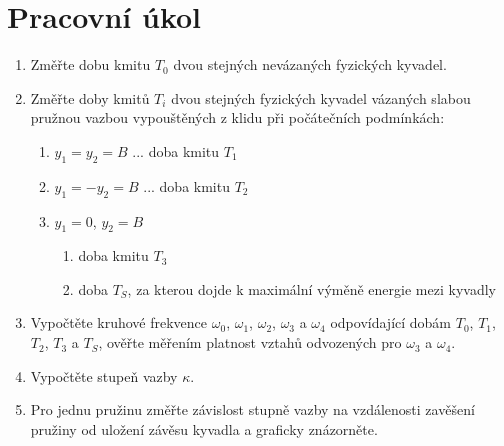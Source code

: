 \documentclass[a4paper]{article}
\author{"Václav Kubíček"}
\begin{document}
\section*{Pracovní úkol}
\begin{enumerate}%
\item Změřte dobu kmitu $T_0$ dvou stejných nevázaných fyzických kyvadel.
\item Změřte doby kmitů $T_i$ dvou stejných fyzických kyvadel vázaných slabou pružnou vazbou vypouštěných z klidu při počátečních podmínkách:
\begin{enumerate}[label=\alph*.]
    \item $y_1=y_2=B$ ... doba kmitu $T_1$
    \item $y_1=-y_2=B$ ... doba kmitu $T_2$
    \item $y_1=0$, $y_2=B$
    \begin{enumerate}[I]
        \item doba kmitu $T_3$
        \item doba ${T_S}$, za kterou dojde k maximální výměně energie mezi kyvadly
    \end{enumerate}
\end{enumerate}
\item Vypočtěte kruhové frekvence $\omega_0$, $\omega_1$, $\omega_2$, $\omega_3$ a $\omega_4$ odpovídající dobám $T_0$, $T_1$, $T_2$, $T_3$ a $T_S$, ověřte měřením platnost vztahů odvozených pro $\omega_3$ a $\omega_4$.
\item Vypočtěte stupeň vazby $\kappa$.
\item Pro jednu pružinu změřte závislost stupně vazby na vzdálenosti zavěšení pružiny od uložení závěsu kyvadla a graficky znázorněte.
\end{enumerate}
\end{document}
